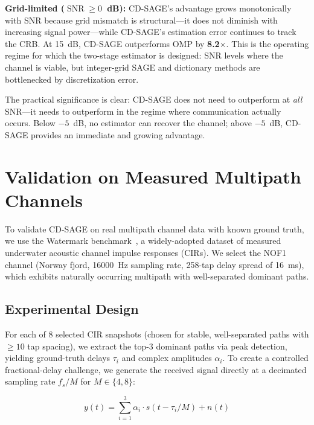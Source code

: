 \documentclass[a4paper,fleqn]{cas-dc}
\DeclareMathOperator{\SNR}{SNR}
\begin{document}
\textbf{Grid-limited ($\SNR \ge 0$~dB):} CD-SAGE's advantage grows monotonically with SNR because grid mismatch is structural---it does not diminish with increasing signal power---while CD-SAGE's estimation error continues to track the CRB. At \SI{+15}{dB}, CD-SAGE outperforms OMP by \textbf{8.2$\times$}. This is the operating regime for which the two-stage estimator is designed: SNR levels where the channel is viable, but integer-grid SAGE and dictionary methods are bottlenecked by discretization error.

The practical significance is clear: CD-SAGE does not need to outperform at \textit{all} SNR---it needs to outperform in the regime where communication actually occurs. Below $-5$~dB, no estimator can recover the channel; above $-5$~dB, CD-SAGE provides an immediate and growing advantage.

\section{Validation on Measured Multipath Channels}
\label{sec:watermark}

To validate CD-SAGE on real multipath channel data with known ground truth, we use the Watermark benchmark~\cite{watermark2017}, a widely-adopted dataset of measured underwater acoustic channel impulse responses (CIRs). We select the NOF1 channel (Norway fjord, \SI{16000}{Hz} sampling rate, 258-tap delay spread of \SI{16}{ms}), which exhibits naturally occurring multipath with well-separated dominant paths.

\subsection{Experimental Design}

For each of 8 selected CIR snapshots (chosen for stable, well-separated paths with $\ge10$ tap spacing), we extract the top-3 dominant paths via peak detection, yielding ground-truth delays $\tau_i$ and complex amplitudes $\alpha_i$. To create a controlled fractional-delay challenge, we generate the received signal directly at a decimated sampling rate $f_s / M$ for $M \in \{4, 8\}$:

\begin{equation}
y(t) = \sum_{i=1}^{3} \alpha_i \cdot s(t - \tau_i / M) + n(t)
\label{eq:wm_sig}
\end{equation}
\end{document}
